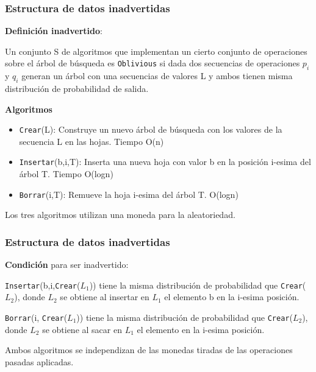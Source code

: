 \documentclass[10pt]{beamer}
\begin{document}

\begin{frame}
\frametitle{Estructura de datos inadvertidas}

\textbf{Definición inadvertido}:

Un conjunto S de algoritmos que implementan un cierto conjunto de operaciones sobre el árbol de búsqueda es
\texttt{Oblivious} si dada dos secuencias de operaciones $p_i$ y $q_i$ generan un árbol con una secuencias
de valores L y ambos tienen misma distribución de probabilidad de salida.


\pause
\textbf{Algoritmos}
\begin{itemize}
  \item \texttt{Crear}(L): Construye un nuevo árbol de búsqueda con los valores de la secuencia L en las hojas. Tiempo O(n)
\pause
  \item \texttt{Insertar}(b,i,T): Inserta una nueva hoja con valor b en la posición i-esima del árbol T. Tiempo O(logn)
\pause
  \item \texttt{Borrar}(i,T): Remueve la hoja i-esima del árbol T. O(logn)
\end{itemize}

\pause
Los tres algoritmos utilizan una moneda para la aleatoriedad.


\end{frame}

\begin{frame}
\frametitle{Estructura de datos inadvertidas}

\textbf{Condición} para ser inadvertido:
\pause

\texttt{Insertar}(b,i,\texttt{Crear}($L_1$)) tiene la misma distribución de probabilidad que \texttt{Crear}($L_2$), donde $L_{2}$
se obtiene al insertar en $L_{1}$ el elemento b en la i-esima posición.
\pause

\texttt{Borrar}(i, \texttt{Crear}($L_{1}$)) tiene la misma distribución de probabilidad que \texttt{Crear}($L_2$), donde $L_{2}$
se obtiene al sacar en $L_{1}$ el elemento en la i-esima posición.

\pause
Ambos algoritmos se independizan de las monedas tiradas de las operaciones pasadas aplicadas.
\end{frame}
\end{document}
